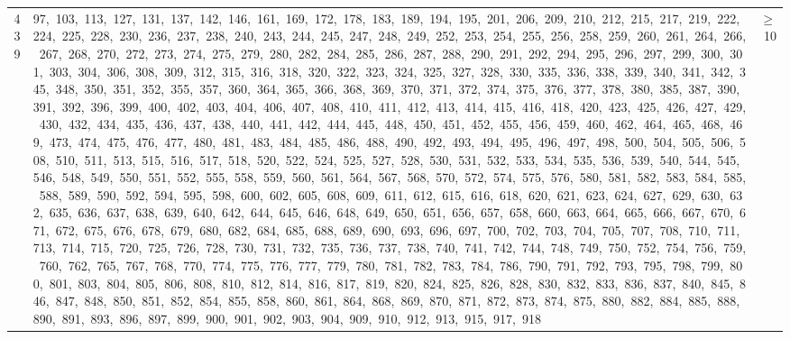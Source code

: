 \begin{longtable}{c|p{}|r}
439 & 97,\ 103,\ 113,\ 127,\ 131,\ 137,\ 142,\ 146,\ 161,\ 169,\ 172,\ 178,\ 183,\ 189,\ 194,\ 195,\ 201,\ 206,\ 209,\ 210,\ 212,\ 215,\ 217,\ 219,\ 222,\ 224,\ 225,\ 228,\ 230,\ 236,\ 237,\ 238,\ 240,\ 243,\ 244,\ 245,\ 247,\ 248,\ 249,\ 252,\ 253,\ 254,\ 255,\ 256,\ 258,\ 259,\ 260,\ 261,\ 264,\ 266,\ 267,\ 268,\ 270,\ 272,\ 273,\ 274,\ 275,\ 279,\ 280,\ 282,\ 284,\ 285,\ 286,\ 287,\ 288,\ 290,\ 291,\ 292,\ 294,\ 295,\ 296,\ 297,\ 299,\ 300,\ 301,\ 303,\ 304,\ 306,\ 308,\ 309,\ 312,\ 315,\ 316,\ 318,\ 320,\ 322,\ 323,\ 324,\ 325,\ 327,\ 328,\ 330,\ 335,\ 336,\ 338,\ 339,\ 340,\ 341,\ 342,\ 345,\ 348,\ 350,\ 351,\ 352,\ 355,\ 357,\ 360,\ 364,\ 365,\ 366,\ 368,\ 369,\ 370,\ 371,\ 372,\ 374,\ 375,\ 376,\ 377,\ 378,\ 380,\ 385,\ 387,\ 390,\ 391,\ 392,\ 396,\ 399,\ 400,\ 402,\ 403,\ 404,\ 406,\ 407,\ 408,\ 410,\ 411,\ 412,\ 413,\ 414,\ 415,\ 416,\ 418,\ 420,\ 423,\ 425,\ 426,\ 427,\ 429,\ 430,\ 432,\ 434,\ 435,\ 436,\ 437,\ 438,\ 440,\ 441,\ 442,\ 444,\ 445,\ 448,\ 450,\ 451,\ 452,\ 455,\ 456,\ 459,\ 460,\ 462,\ 464,\ 465,\ 468,\ 469,\ 473,\ 474,\ 475,\ 476,\ 477,\ 480,\ 481,\ 483,\ 484,\ 485,\ 486,\ 488,\ 490,\ 492,\ 493,\ 494,\ 495,\ 496,\ 497,\ 498,\ 500,\ 504,\ 505,\ 506,\ 508,\ 510,\ 511,\ 513,\ 515,\ 516,\ 517,\ 518,\ 520,\ 522,\ 524,\ 525,\ 527,\ 528,\ 530,\ 531,\ 532,\ 533,\ 534,\ 535,\ 536,\ 539,\ 540,\ 544,\ 545,\ 546,\ 548,\ 549,\ 550,\ 551,\ 552,\ 555,\ 558,\ 559,\ 560,\ 561,\ 564,\ 567,\ 568,\ 570,\ 572,\ 574,\ 575,\ 576,\ 580,\ 581,\ 582,\ 583,\ 584,\ 585,\ 588,\ 589,\ 590,\ 592,\ 594,\ 595,\ 598,\ 600,\ 602,\ 605,\ 608,\ 609,\ 611,\ 612,\ 615,\ 616,\ 618,\ 620,\ 621,\ 623,\ 624,\ 627,\ 629,\ 630,\ 632,\ 635,\ 636,\ 637,\ 638,\ 639,\ 640,\ 642,\ 644,\ 645,\ 646,\ 648,\ 649,\ 650,\ 651,\ 656,\ 657,\ 658,\ 660,\ 663,\ 664,\ 665,\ 666,\ 667,\ 670,\ 671,\ 672,\ 675,\ 676,\ 678,\ 679,\ 680,\ 682,\ 684,\ 685,\ 688,\ 689,\ 690,\ 693,\ 696,\ 697,\ 700,\ 702,\ 703,\ 704,\ 705,\ 707,\ 708,\ 710,\ 711,\ 713,\ 714,\ 715,\ 720,\ 725,\ 726,\ 728,\ 730,\ 731,\ 732,\ 735,\ 736,\ 737,\ 738,\ 740,\ 741,\ 742,\ 744,\ 748,\ 749,\ 750,\ 752,\ 754,\ 756,\ 759,\ 760,\ 762,\ 765,\ 767,\ 768,\ 770,\ 774,\ 775,\ 776,\ 777,\ 779,\ 780,\ 781,\ 782,\ 783,\ 784,\ 786,\ 790,\ 791,\ 792,\ 793,\ 795,\ 798,\ 799,\ 800,\ 801,\ 803,\ 804,\ 805,\ 806,\ 808,\ 810,\ 812,\ 814,\ 816,\ 817,\ 819,\ 820,\ 824,\ 825,\ 826,\ 828,\ 830,\ 832,\ 833,\ 836,\ 837,\ 840,\ 845,\ 846,\ 847,\ 848,\ 850,\ 851,\ 852,\ 854,\ 855,\ 858,\ 860,\ 861,\ 864,\ 868,\ 869,\ 870,\ 871,\ 872,\ 873,\ 874,\ 875,\ 880,\ 882,\ 884,\ 885,\ 888,\ 890,\ 891,\ 893,\ 896,\ 897,\ 899,\ 900,\ 901,\ 902,\ 903,\ 904,\ 909,\ 910,\ 912,\ 913,\ 915,\ 917,\ 918 & $\ge$ 10 \\

\end{longtable}
